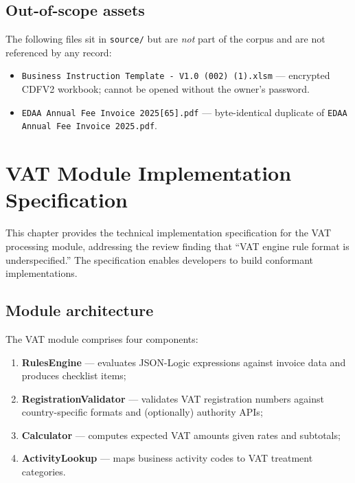 \documentclass[11pt,a4paper,twoside]{report}
\newcommand{\corpus}{}
\begin{document}
\section{Out-of-scope assets}

The following files sit in
\corpus\texttt{source/} but are \emph{not} part of the corpus and
are not referenced by any record:

\begin{itemize}
  \item \texttt{Business Instruction Template - V1.0 (002) (1).xlsm} ---
        encrypted CDFV2 workbook; cannot be opened without the owner's
        password.
  \item \texttt{EDAA Annual Fee Invoice 2025[65].pdf} --- byte-identical
        duplicate of \texttt{EDAA Annual Fee Invoice 2025.pdf}.
\end{itemize}
\chapter{VAT Module Implementation Specification}\label{ch:vat-impl}

This chapter provides the technical implementation specification for the VAT
processing module, addressing the review finding that ``VAT engine rule format
is underspecified.'' The specification enables developers to build conformant
implementations.

\section{Module architecture}

The VAT module comprises four components:

\begin{enumerate}
  \item \textbf{RulesEngine} --- evaluates JSON-Logic expressions against invoice
        data and produces checklist items;
  \item \textbf{RegistrationValidator} --- validates VAT registration numbers
        against country-specific formats and (optionally) authority APIs;
  \item \textbf{Calculator} --- computes expected VAT amounts given rates and
        subtotals;
  \item \textbf{ActivityLookup} --- maps business activity codes to VAT
        treatment categories.
\end{enumerate}
\end{document}
